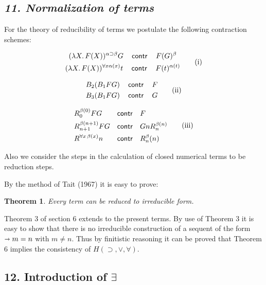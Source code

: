 \documentclass[12pt]{article}
\makeatletter
\newcommand{\leqnos}{\tagsleft@true\let\veqno\@@leqno}
\def\imp{\shortrightarrow}
\def\l{\lambda}
\def\limp{\supset}
\def\a{\alpha}
\def\b{\beta}
\def\HIMP{H(\limp, \lor, \forall)}
\newtheorem{theorem}{Theorem}
\makeatother
\begin{document}
\subsection*{\it 11. Normalization of terms}

\leqnos

For the theory of reducibility of terms we postulate the following contraction
schemes:

\begin{equation}
\begin{gathered}
(\l X. \, F(X))^{\a \limp \b} G \quad \contr \quad F(G)^\b \\
(\l X. \, F(X))^{\forall x \a(x)} t \quad \contr\quad  F(t)^{\a(t)}
\end{gathered}
\tag{i}
\end{equation}

\begin{equation}
\begin{aligned}
B_2 (B_1 FG) & \quad \mathop{\sf contr} \quad F\\
B_3 (B_1 FG) & \quad \mathop{\sf contr}\quad  G\\
\end{aligned}
\tag{ii}
\end{equation}

\begin{equation}
\begin{aligned}
&R_0^{\b(0)} FG & \contr & \quad F\\
&R_{n+1}^{\b(n+1)} FG & \contr & \quad GnR_n^{\b(n)}\\
&R^{\forall x \, \b(x)} n & \contr & \quad R_n^\b(n)
\end{aligned}
\tag{iii}
\end{equation}

Also we consider the steps in the calculation of closed numerical terms to be
reduction steps. 

By the method of Tait (1967) it is easy to prove:

\begin{theorem}
Every term can be reduced to irreducible form.
\end{theorem}

Theorem 3 of section 6 extends to the present terms. By use of Theorem 3 it is easy to show that there is no irreducible construction of a sequent of the form $\imp m = n$ with $m \neq n$. Thus by finitistic reasoning it can be proved that Theorem 6 implies the consistency of $\HIMP$.

\subsection*{12. Introduction of $\exists$}
\end{document}
